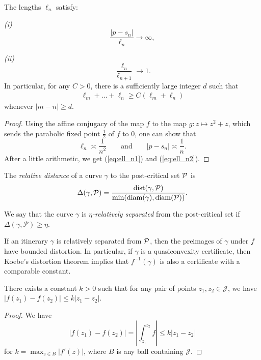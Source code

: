 \begin{lemma} \label{lem-ell_n}
	The lengths ${\ell_n}$ satisfy:
	
	{\em (i)}
	\begin{equation}
	\label{eq:ell_n1}
		\frac {|p-s_n|}{\ell_n} \to \infty,
	\end{equation}
	
	{\em (ii)}
	\begin{equation}
	\label{eq:ell_n2}
		\frac{\ell_n}{\ell_{n+1}} \to 1.
	\end{equation}
	In particular, for any $C > 0$, there is a sufficiently large integer $d$ such that
	\begin{align*}
		\ell_{m}+\ldots+\ell_{n} \geq C (\ell_m+\ell_n)
	\end{align*}
	whenever $|m-n| \geq d$.
\end{lemma}

\begin{proof}
Using the affine conjugacy of the map $f$ to the map $g: z\mapsto z^2+z$, which sends the parabolic fixed point $\frac{1}{2}$ of $f$ to $0$, one can show that
$$
\ell_n \asymp \frac{1}{n^2} \qquad \text{and} \qquad |p - s_n| \asymp \frac{1}{n}.
$$
After a little arithmetic, we get (\ref{eq:ell_n1}) and (\ref{eq:ell_n2}).
\end{proof}

\begin{definition}
The \emph{relative distance} of a curve $\gamma$ to the post-critical set $\operatorname{\mathcal P}$ is 
$$
\Delta (\gamma, \mathcal P) = \frac {\operatorname{dist}(\gamma, \mathcal P)}{\min (\operatorname{diam} (\gamma), \operatorname{diam} (\mathcal P))}.
$$

We say that the curve $\gamma$ is \emph{$\eta$-relatively separated} from the post-critical set if $\Delta (\gamma, \mathcal P) \geq \eta$.  
\end{definition}
 
If an itinerary $\gamma$ is relatively separated from $\operatorname{\mathcal P}$, then the preimages of $\gamma$ under $f$ have bounded distortion. In particular, if $\gamma$ is a quasiconvexity certificate, then Koebe's distortion theorem implies that $f^{-1}(\gamma)$ is also a certificate with a comparable constant.

\begin{lemma}
There exists a constant $k>0$ such that for any pair of points $z_1, z_2 \in \mathcal J$, we have $|f(z_1)-f(z_2)| \leq k|z_1-z_2|$.
\end{lemma}

\begin{proof}
	We have 
	\begin{equation}
		|f(z_1)-f(z_2)| = \left |\int_{z_1} ^{z_2} f \right | \leq k|z_1-z_2|	
	\end{equation}
for $k=\max_{z \in B} |f'(z)|$, where $B$ is any ball containing $\mathcal J$. 
\end{proof}
 
